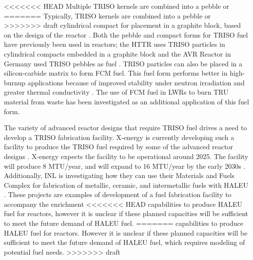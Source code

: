 <<<<<<< HEAD
Multiple \gls{TRISO} kernels are combined into a pebble or 
=======
Typically, \gls{TRISO} kernels are combined into a pebble or 
>>>>>>> draft
cylindrical compact for placement in a graphite block, based on the 
design of the reactor \cite{demkowicz_coated_2019}. Both the 
pebble and compact forms for 
\gls{TRISO} fuel have previously been used in reactors; the \gls{HTTR}
uses 
\gls{TRISO} particles in cylindrical compacts embedded in a graphite block 
\cite{shiozawa_overview_2004} and the AVR Reactor in Germany used 
\gls{TRISO} pebbles as fuel \cite{gottaut_results_1990}.
\gls{TRISO} particles can also be placed in a silicon-carbide matrix 
to form \gls{FCM} fuel. This fuel form performs better in high-burnup 
applications because of improved stability under neutron irradiation and 
greater thermal conductivity \cite{snead_fully_2011}. The use of 
\gls{FCM} fuel in \glspl{LWR} to burn \gls{TRU} material from waste 
has been investigated \cite{snead_fully_2011,venneri_fully_2011} as 
an additional application of this fuel form. 

The variety of advanced reactor designs that require \gls{TRISO} fuel 
drives a need to develop a \gls{TRISO} fabrication facility. 
X-energy is currently developing such a facility to 
produce the \gls{TRISO} fuel required by some of the advanced 
reactor designs \cite{x-energy_triso-x_2022}. X-energy expects the 
facility to be operational around 2025. The facility will 
produce 8 MTU/year, and will expand to 16 MTU/year 
by the early 2030s \cite{x-energy_triso-x_2022}. Additionally,
\gls{INL} is investigating 
how they can use their Materials and Fuels Complex for 
fabrication of metallic, ceramic, and intermetallic fuels with 
\gls{HALEU} \cite{crawford_fuel_2019}. These projects 
are examples of development 
of a fuel fabrication facility to accompany the enrichment 
<<<<<<< HEAD
capabilities to produce \gls{HALEU} fuel for reactors, however
it is unclear if these planned capacities will be sufficient to 
meet the future demand of \gls{HALEU} fuel. 
=======
capabilities to produce \gls{HALEU} fuel for reactors. However
it is unclear if these planned capacities will be sufficient to 
meet the future demand of \gls{HALEU} fuel, which requires 
modeling of potential fuel needs. 
>>>>>>> draft

